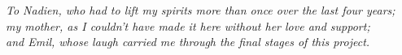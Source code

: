 \begin{dedication}      %

\thispagestyle{plain}

\textit{To Nadien, who had to lift my spirits more than once over the last four years; \\ 
				my mother, as I couldn't have made it here without her love and support; \\
				and Emil, whose laugh carried me through the final stages of this project.}

\end{dedication}
